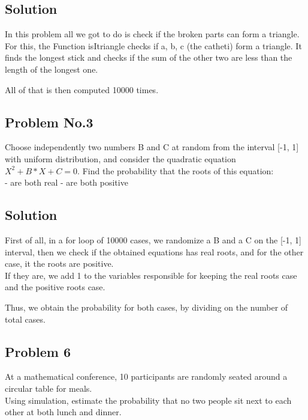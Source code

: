 \documentclass{article}
\begin{document}
    \subsection{Solution}
    In this problem all we got to do is check if the broken parts can form a triangle.\\
    For this, the Function isItriangle checks if a, b, c (the catheti) form a triangle.
    It finds the longest stick and checks if the sum of the other two are less
    than the length of the longest one.

    All of that is then computed 10000 times.

  \newpage

    \subsection{Problem No.3}

    Choose independently two numbers B and C at random from the interval [-1, 1]
    with uniform distribution, and consider the quadratic equation \(X^2 + B*X + C = 0\).
    Find the probability that the roots of this equation:\\
      - are both real
      - are both positive

    \subsection{Solution}

    First of all, in a for loop of 10000 cases, we randomize a B and a C on the [-1, 1]
    interval, then we check if the obtained equations has real roots, and for the
    other case, it the roots are positive.\\
    If they are, we add 1 to the variables responsible for keeping the real roots case
    and the positive roots case.

    Thus, we obtain the probability for both cases, by dividing on the number
    of total cases.

  \newpage

    \subsection{Problem 6}

    At a mathematical conference, 10 participants are randomly seated around a circular table for meals.\\
    Using simulation, estimate the probability
    that no two people sit next to each other at both lunch and dinner.
\end{document}
